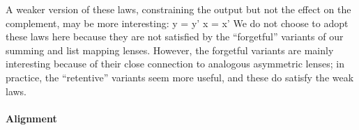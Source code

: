 
\iffull
A weaker version of these laws, constraining the output but not the effect
on the complement, may be more interesting:
%
{
  {y = y'}
  {x = x'}
}
%
  We do not choose to adopt these laws here because they are not satisfied
  by the ``forgetful'' variants of our summing and list mapping lenses.
  However, the forgetful variants are mainly interesting because of
  their close connection to analogous asymmetric lenses; in practice, the
  ``retentive'' variants seem more useful, and these do satisfy the weak
   laws.  
\fi %

\paragraph*{Alignment}\label{firstalign}

